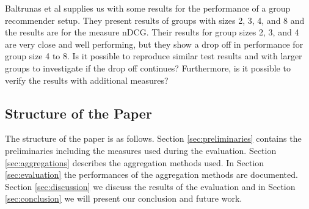 
Baltrunas et al supplies us with some results for the performance of a group recommender setup. They present results of groups with sizes 2, 3, 4, and 8 and the results are for the measure nDCG. Their results for group sizes 2, 3, and 4 are very close and well performing, but they show a drop off in performance for group size 4 to 8. Is it possible to reproduce similar test results and with larger groups to investigate if the drop off continues? Furthermore, is it possible to verify the results with additional measures?


\subsection{Structure of the Paper}
The structure of the paper is as follows. Section \ref{sec:preliminaries} contains the preliminaries including the measures used during the evaluation. Section \ref{sec:aggregations} describes the aggregation methods used. In Section \ref{sec:evaluation} the performances of the aggregation methods are documented. Section \ref{sec:discussion} we discuss the results of the evaluation and in Section \ref{sec:conclusion} we will present our conclusion and future work.